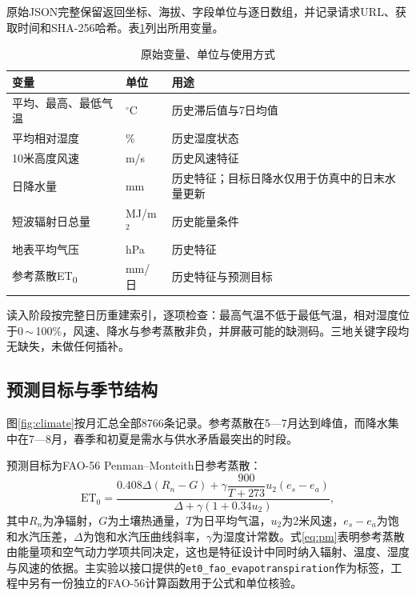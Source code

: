 原始JSON完整保留返回坐标、海拔、字段单位与逐日数组，并记录请求URL、获取时间和SHA-256哈希。表\ref{tab:variables}列出所用变量。

\begin{table}[H]\centering\small
\caption{原始变量、单位与使用方式}\label{tab:variables}
\begin{tabularx}{\linewidth}{@{}p{.25\linewidth}p{.18\linewidth}X@{}}\toprule
变量 & 单位 & 用途\\\midrule
平均、最高、最低气温 & $^\circ$C & 历史滞后值与7日均值\\
平均相对湿度 & \% & 历史湿度状态\\
10米高度风速 & m/s & 历史风速特征\\
日降水量 & mm & 历史特征；目标日降水仅用于仿真中的日末水量更新\\
短波辐射日总量 & MJ/m$^2$ & 历史能量条件\\
地表平均气压 & hPa & 历史特征\\
参考蒸散ET\textsubscript{0} & mm/日 & 历史特征与预测目标\\\bottomrule
\end{tabularx}
\end{table}

读入阶段按完整日历重建索引，逐项检查：最高气温不低于最低气温，相对湿度位于0\,$\sim$\,100\%，风速、降水与参考蒸散非负，并屏蔽可能的缺测码。三地关键字段均无缺失，未做任何插补。

\subsection{预测目标与季节结构}
图\ref{fig:climate}按月汇总全部8766条记录。参考蒸散在5—7月达到峰值，而降水集中在7—8月，春季和初夏是需水与供水矛盾最突出的时段。


预测目标为FAO-56 Penman--Monteith日参考蒸散\cite{fao}：
\begin{equation}\label{eq:pm}
\mathrm{ET}_0=\frac{0.408\Delta(R_n-G)+\gamma\dfrac{900}{T+273}u_2(e_s-e_a)}{\Delta+\gamma(1+0.34u_2)},
\end{equation}
其中$R_n$为净辐射，$G$为土壤热通量，$T$为日平均气温，$u_2$为2米风速，$e_s-e_a$为饱和水汽压差，$\Delta$为饱和水汽压曲线斜率，$\gamma$为湿度计常数。式\eqref{eq:pm}表明参考蒸散由能量项和空气动力学项共同决定，这也是特征设计中同时纳入辐射、温度、湿度与风速的依据。主实验以接口提供的\texttt{et0\_fao\_evapotranspiration}作为标签，工程中另有一份独立的FAO-56计算函数用于公式和单位核验。

